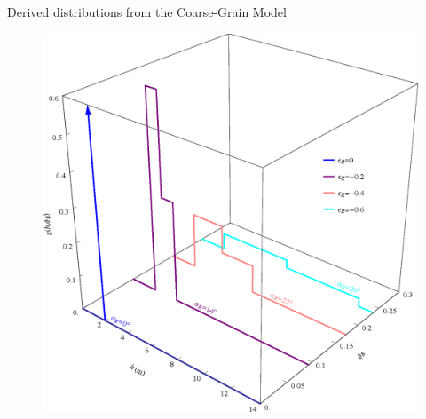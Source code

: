 \documentclass[aspectratio=169,11pt]{beamer}
\begin{document}
\begin{frame}
\frametitle{\insertsection}
\centering
Derived distributions from the Coarse-Grain Model
\begin{figure}[h]
\includegraphics[width=\textwidth,height=0.8\textheight,keepaspectratio]{Figures/single_ridge_redistribution.eps}
\end{figure}
\end{frame}
\end{document}
